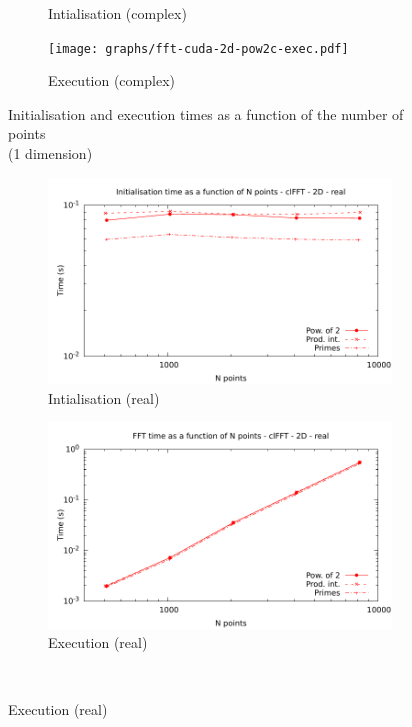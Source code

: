 \documentclass[12pt, a4paper]{article}
\begin{document}
\begin{figure}[H]
\begin{subfigure}{.5\textwidth}
\caption{Intialisation (complex)}
\label{FFTCUDA1DCI}
\end{subfigure}%
\begin{subfigure}{.5\textwidth}
\centering
\texttt{[image: graphs/fft-cuda-2d-pow2c-exec.pdf]}
\caption{Execution (complex)}
\label{FFTCUDA1DCE}
\end{subfigure}
\caption{Initialisation and execution times as a function of the number of points\\(1 dimension)}
\label{FFTCUDA1D}
\end{figure}

\begin{figure}[H]
\captionsetup{width=0.8\linewidth}
\centering
\begin{subfigure}{.5\textwidth}
\centering
\includegraphics[width=.9\linewidth]{graphs/fft-opencl-2d-pow2-r-init.pdf}
\caption{Intialisation (real)}
\label{FFTCL1DRI}
\end{subfigure}%
\begin{subfigure}{.5\textwidth}
\centering
\includegraphics[width=.9\linewidth]{graphs/fft-opencl-2d-pow2-r-exec.pdf}
\caption{Execution (real)}
\label{FFTCL1DRE}
\end{subfigure}\\

\end{figure}
\end{document}
